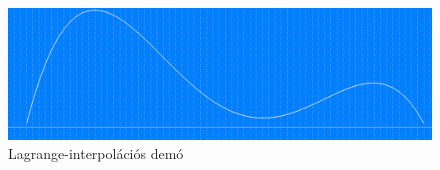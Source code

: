 \begin{figure}[h]
\centering
\includegraphics[scale=0.43]{kepek/lagrange_graphics.png}
\caption{Lagrange-interpolációs demó}
\label{fig:lagrange_demo}
\end{figure}

